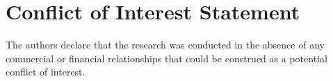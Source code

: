 \documentclass[utf8]{frontiersSCNS} %
\begin{document}




\section*{Conflict of Interest Statement}

The authors declare that the research was conducted in the absence of any commercial or financial relationships that could be construed as a potential conflict of interest.
\end{document}
